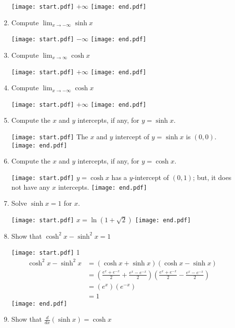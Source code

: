 \documentclass[12pt]{article}
\begin{document}
\begin{enumerate}
\begin{enumerate}
\texttt{[image: start.pdf]}
{{$+\infty$}}
\texttt{[image: end.pdf]}


\item Compute $\lim_{x \rightarrow -\infty}{\sinh{x}}$

\texttt{[image: start.pdf]}
{{$-\infty$}}
\texttt{[image: end.pdf]}


\item Compute $\lim_{x \rightarrow \infty}{\cosh{x}}$

\texttt{[image: start.pdf]}
{{$+\infty$}}
\texttt{[image: end.pdf]}


\item Compute $\lim_{x \rightarrow -\infty}{\cosh{x}}$

\texttt{[image: start.pdf]}
{{$+\infty$}}
\texttt{[image: end.pdf]}


\item Compute the $x$ and $y$ intercepts, if any, for $y=\sinh{x}$.

\texttt{[image: start.pdf]}
{{The $x$ and $y$ intercept of $y=\sinh{x}$ is $(0,0)$.}}
\texttt{[image: end.pdf]}


\item Compute the $x$ and $y$ intercepts, if any, for $y=\cosh{x}$.

\texttt{[image: start.pdf]}
{{$y=\cosh{x}$ has a $y$-intercept of  $(0,1)$; but, it does not have any $x$ intercepts.}}
\texttt{[image: end.pdf]}


\item Solve $\sinh{x}=1$ for $x$.

\texttt{[image: start.pdf]}
{{$x=\ln{\left(1+\sqrt{2}\right)}$}}
\texttt{[image: end.pdf]}


\item Show that $\cosh^2{x}-\sinh^2{x}=1$

\texttt{[image: start.pdf]}
{{{1\linewidth}{
\begin{align*}
\cosh^2{x}-\sinh^{2}{x} & = (\cosh{x}+\sinh{x})(\cosh{x}-\sinh{x})\\
&=\left(\frac{e^x+e^{-x}}{2}+\frac{e^x-e^{-x}}{2}\right)\left(\frac{e^x+e^{-x}}{2}-\frac{e^x-e^{-x}}{2}\right)\\
&=(e^x)(e^{-x})\\
&=1
\end{align*}
}}}
\texttt{[image: end.pdf]}


\item Show that $\frac{d}{dx}(\sinh{x})=\cosh{x}$


\end{enumerate}
\end{enumerate}
\end{document}
